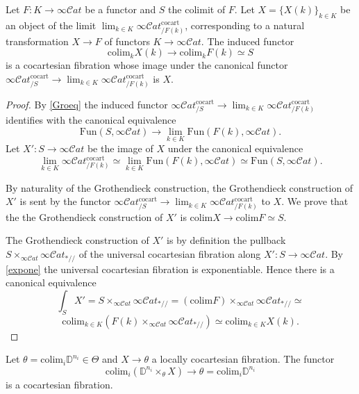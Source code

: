 \documentclass[10pt,oneside]{article}
\numberwithin{equation}{section} %
\numberwithin{figure}{section} %
\theoremstyle{plain}
\theoremstyle{definition}
\newcommand{\bD}{{\mathbb D}}
\newcommand{\colim}{\mathrm{colim}}
\newcommand{\Fun}{\mathrm{Fun}}
\newcommand{\cocart}{{\mathrm{cocart}}}
\newcommand{\scat}{\mathcal{C}\mathit{at}}
\begin{document}
\begin{corollary}\label{inverso} Let $F: K \to \infty\scat$ be a functor and $S$ the colimit of $F.$
Let $ X=\{X(k)\}_{k\in K}$ be an object of the limit $\lim_{k \in K} \infty\scat^{\cocart}_{/F(k)} $,
corresponding to a natural transformation $X \to F$ of functors
$K \to \infty\scat$.
The induced functor $$\colim_k X(k) \to \colim_k F(k) \simeq S $$
is a cocartesian fibration whose image under the canonical functor
$ \infty\scat^{\cocart}_{/S} \to \lim_{k \in K}\infty\scat^{\cocart}_{/F(k)} $ is $X.$
\end{corollary}

\begin{proof}
By \cref{Groeq} the induced functor
$ \infty\scat^{\cocart}_{/S} \to \lim_{k \in K}\infty\scat^{\cocart}_{/F(k)} $
identifies with the canonical equivalence
$$\Fun(S,\infty\scat) \to \lim_{k \in K} \Fun(F(k), \infty\scat).$$
Let $X': S \to \infty\scat $ be the image of $X$ under the canonical equivalence
$$ \lim_{k \in K}\infty\scat^{\cocart}_{/F(k)} \simeq \lim_{k \in K} \Fun(F(k), \infty\scat) \simeq \Fun(S,\infty\scat). $$

By naturality of the Grothendieck construction, the Grothendieck construction of $X'$ is sent by the functor
$ \infty\scat^{\cocart}_{/S} \to \lim_{k \in K}\infty\scat^{\cocart}_{/F(k)} $ to $X.$
We prove that the the Grothendieck construction of $X'$ is
$\colim X \to \colim F \simeq S. $

The Grothendieck construction of $X'$ is by definition the pullback
$ S \times_{\infty\scat} \infty\scat_{*//} $ of the universal cocartesian fibration along $X': S \to \infty\scat.$
By \cref{expone} the universal cocartesian fibration is exponentiable. Hence there is a canonical equivalence
$$ \int_S X' = S \times_{\infty\scat} \infty\scat_{*//} = (\colim F) \times_{\infty\scat} \infty\scat_{*//} \simeq $$$$ \colim_{k \in K}(F(k) \times_{\infty\scat} \infty\scat_{*//}) \simeq \colim_{k \in K} X(k) .$$
\end{proof}

\begin{corollary}

Let $\theta = \colim_{i} \bD^{n_i} \in \Theta$ and $X \to \theta$ a locally cocartesian fibration. The functor $$ \colim_{i} (\bD^{n_i} \times_{\theta} X) \to \theta = \colim_{i} \bD^{n_i} $$ is a cocartesian fibration. 

\end{corollary}
\end{document}
